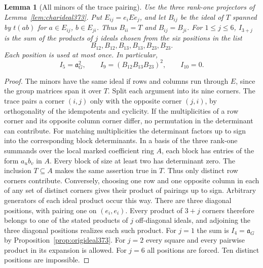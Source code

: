 \documentclass[a4paper,11pt]{article}
\newtheorem{lemma}[proposition]{Lemma}
\theoremstyle{definition}
\theoremstyle{remark}
\numberwithin{equation}{section}
\begin{document}
\begin{lemma}[All minors of the trace pairing]
\label{lem:allminors378}
Use the three rank-one projectors of
Lemma~\ref{lem:charideal373}. Put \(E_{ij}=e_iEe_j\), and let
\(B_{ij}\) be the ideal of \(T\) spanned by \(t(ab)\) for
\(a\in E_{ij}\), \(b\in E_{ji}\). Thus \(B_{ii}=T\) and
\(B_{ij}=B_{ji}\). For \(1\le j\le6\), \(I_{3+j}\) is the
sum of the products of \(j\) ideals chosen from the six
\emph{positions} in the list
\[
                 B_{12},B_{12}, B_{13},B_{13}, B_{23},B_{23}.
\]
Each position is used at most once. In particular,
\[
 I_5=\mathfrak a_G^2,\qquad I_9=(B_{12}B_{13}B_{23})^2,
 \qquad I_{10}=0.
\]
\end{lemma}
\begin{proof}
The minors have the same ideal if rows and columns run
through \(E\), since the group matrices span it over \(T\).
Split each argument into its nine corners. The trace pairs
a corner \((i,j)\) only with the opposite corner \((j,i)\),
by orthogonality of the idempotents and cyclicity.
If the multiplicities of a row corner and its opposite
column corner differ, no permutation in the determinant
can contribute. For matching multiplicities the determinant
factors up to sign into the corresponding block determinants.
In a basis of the three rank-one summands over the local
marked coefficient ring \(A\), each block has entries of
the form \(a_u b_v\) in \(A\). Every block of size at least
two has determinant zero. The inclusion \(T\subseteq A\)
makes the same assertion true in \(T\). Thus only distinct
row corners contribute. Conversely, choosing one row and
one opposite column in each of any set of distinct corners
gives their product of pairings up to sign. Arbitrary generators
of each ideal product occur this way. There are three diagonal
positions, with pairing one on \((e_i,e_i)\). Every product
of \(3+j\) corners therefore belongs to one of the stated
products of \(j\) off-diagonal ideals, and adjoining the
three diagonal positions realizes each such product.
For \(j=1\) the sum is \(I_4=\mathfrak a_G\) by
Proposition~\ref{prop:origideal373}. For \(j=2\) every square
and every pairwise product in its expansion is allowed.
For \(j=6\) all positions are forced. Ten distinct positions
are impossible.
\end{proof}
\end{document}
